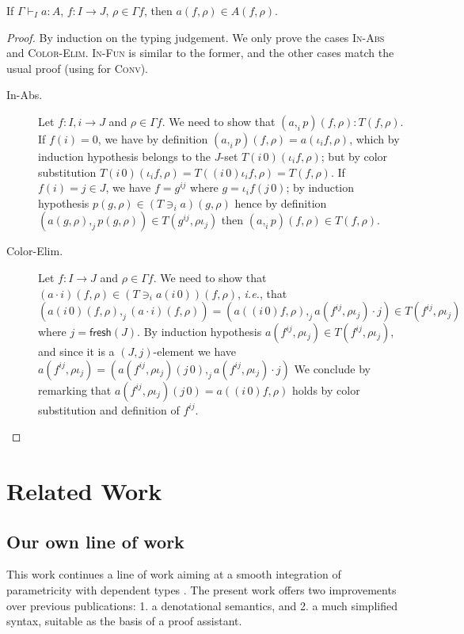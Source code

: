 \documentclass[english]{PaperTools/latex/lipics}
\newcommand\param[1]{\!\cdot\!#1}
\newcommand\op[1]{∋_{#1}}
\def\fresh#1{\mathsf{fresh}(#1)}
\def\ie{\textit{i.e.}}
\begin{document}
\begin{theorem}[Validity]
  If $Γ ⊢_I a : A$, $f : I → J$, $ρ ∈ Γf$, then $a(f,ρ) ∈ A(f,ρ)$.
\end{theorem}
\begin{proof}
  By induction on the typing judgement.  We only prove the cases \textsc{In-Abs} and \textsc{Color-Elim}.  \textsc{In-Fun} is similar to the former, and the other
  cases match the usual proof (using  for \textsc{Conv}).
  \begin{description}
    \item[\sc In-Abs.]
      Let $f : I,i → J$ and $ρ ∈ Γf$.
      We need to show that $(a ,_i p)(f,ρ) : T(f,ρ)$.
      If $f(i) = 0$, we have by definition $(a,_ip)(f,ρ) = a(ι_i f,ρ)$,
      which by induction hypothesis belongs to the $J$-set $T(i\,0)(ι_i f,ρ)$;
      but by color substitution $T(i\,0)(ι_i f,ρ) = T((i\,0)ι_i f,ρ) = T(f,ρ)$.
      If $f(i) = j ∈ J$, we have $f = g^{ij}$ where $g = ι_if(j\,0)$; by induction
      hypothesis $p(g,ρ) ∈ (T \op i a)(g,ρ)$ hence by definition
      $(a(g,ρ) ,_j p(g,ρ)) ∈ T(g^{ij},ρι_j)$ then
      $(a ,_i p)(f,ρ) ∈ T(f,ρ)$.

    \item[\sc Color-Elim.]
      Let $f : I → J$ and $ρ ∈ Γf$.
      We need to show that $(a \param i)(f,ρ) ∈ (T \op i {a(i\,0)}) (f,ρ)$, \ie,
      that
      $ (a(i\,0)(f,ρ) ,_j (a \param i)(f,ρ))
      = (a((i\,0)f,ρ) ,_j a(f^{ij},ρι_j) · j)
      ∈ T(f^{ij},ρι_j)$
      where $j = \fresh J$.
      By induction hypothesis $a(f^{ij},ρι_j) ∈ T(f^{ij},ρι_j)$, and since it is a
      $(J,j)$-element we have
      $a(f^{ij},ρι_j) = (a(f^{ij},ρι_j)(j\,0) ,_j a(f^{ij},ρι_j) · j)$
      We conclude by remarking that $a(f^{ij},ρι_j)(j\,0) = a((i\,0)f,ρ)$ holds
      by color substitution and definition of $f^{ij}$.
    \qedhere
  \end{description}

\end{proof}

\section{Related Work}

\subsection{Our own line of work}
This work continues a line of work aiming at a smooth integration of
parametricity with dependent types
\citep{bernardy_parametricity_2010,bernardy_realizability_2011,bernardy_proofs_2012,bernardy_computational_2012,bernardy_type-theory_2013}. The present work offers two improvements over previous publications:
1. a denotational semantics, and
2. a much simplified syntax, suitable as the basis of a proof assistant.
\end{document}
